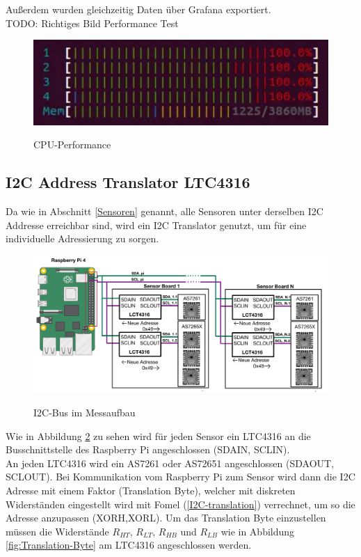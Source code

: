 Außerdem wurden gleichzeitig Daten über Grafana exportiert.\\
TODO: Richtiges Bild Performance Test\\
\begin{figure}[H]
  \centering
  \caption{CPU-Performance}
 \includegraphics[width=0.7\linewidth]{img/CPU-Performance.png}
  \label{fig:CPU-Performance}
\end{figure}

\subsection{I2C Address Translator LTC4316}\label{I2C-Translator}
Da wie in Abschnitt \ref{Sensoren} genannt, alle Sensoren unter derselben I2C Addresse erreichbar sind, wird ein I2C Translator genutzt, um für eine individuelle Adressierung zu sorgen.\\

\begin{figure}[H]
  \centering
  \caption{I2C-Bus im Messaufbau}
 \includegraphics[width=1\linewidth]{img/Adress-Translation}
  \label{fig:adress-translation}
\end{figure}
\noindent Wie in Abbildung \ref{fig:adress-translation} zu sehen wird für jeden Sensor ein LTC4316 an die Busschnittstelle des Raspberry Pi angeschlossen (SDAIN, SCLIN).\\ 
An jeden LTC4316 wird ein AS7261 oder AS72651 angeschlossen (SDAOUT, SCLOUT).
Bei Kommunikation vom Raspberry Pi zum Sensor wird dann die I2C Adresse mit einem Faktor (Translation Byte), welcher mit diskreten Widerständen eingestellt wird mit Fomel (\ref{I2C-translation}) verrechnet, um so die Adresse anzupassen (XORH,XORL).
Um das Translation Byte einzustellen müssen die Widerstände $R_{HT}$, $R_{LT}$, $R_{HB}$ und $R_{LB}$ wie in Abbildung \ref{fig:Translation-Byte} am LTC4316 angeschlossen werden.


